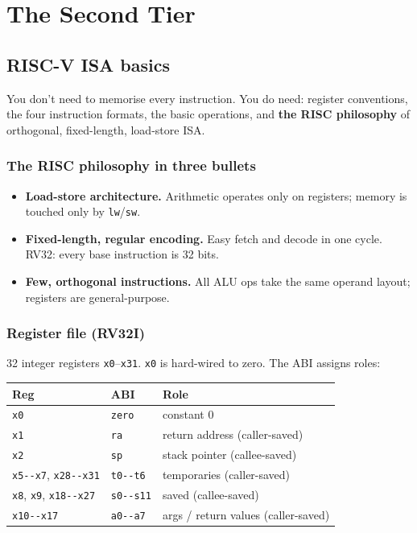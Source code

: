 \documentclass[11pt,a4paper]{article}
\begin{document}
\hrulefill

\section{The Second Tier}

\subsection{RISC-V ISA basics}

\begin{useful}
You don't need to memorise every instruction. You do need: register conventions, the four instruction formats, the basic operations, and \textbf{the RISC philosophy} of orthogonal, fixed-length, load-store ISA.
\end{useful}

\subsubsection*{The RISC philosophy in three bullets}

\begin{itemize}[leftmargin=*,itemsep=1pt]
  \item \textbf{Load-store architecture.} Arithmetic operates only on registers; memory is touched only by \texttt{lw}/\texttt{sw}.
  \item \textbf{Fixed-length, regular encoding.} Easy fetch and decode in one cycle. RV32: every base instruction is 32 bits.
  \item \textbf{Few, orthogonal instructions.} All ALU ops take the same operand layout; registers are general-purpose.
\end{itemize}

\subsubsection*{Register file (RV32I)}

32 integer registers \verb|x0|--\verb|x31|. \verb|x0| is hard-wired to zero. The ABI assigns roles:

\begin{center}
\begin{tabular}{lll}
\hline
Reg & ABI & Role \\
\hline
\verb|x0|      & \verb|zero|  & constant 0 \\
\verb|x1|      & \verb|ra|    & return address (caller-saved) \\
\verb|x2|      & \verb|sp|    & stack pointer (callee-saved) \\
\verb|x5--x7|, \verb|x28--x31| & \verb|t0--t6| & temporaries (caller-saved) \\
\verb|x8|, \verb|x9|, \verb|x18--x27| & \verb|s0--s11| & saved (callee-saved) \\
\verb|x10--x17|              & \verb|a0--a7| & args / return values (caller-saved) \\
\hline
\end{tabular}
\end{center}
\end{document}
